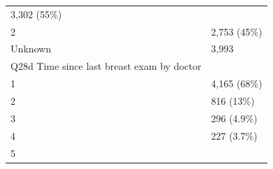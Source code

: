 \documentclass[]{article}
\begin{document}
\begin{longtable}[]{@{}ll@{}}
\begin{minipage}[t]{0.23\columnwidth}
3,302 (55\%)\strut
\end{minipage}\tabularnewline
\begin{minipage}[t]{0.71\columnwidth}\raggedright
2\strut
\end{minipage} & \begin{minipage}[t]{0.23\columnwidth}\raggedright
2,753 (45\%)\strut
\end{minipage}\tabularnewline
\begin{minipage}[t]{0.71\columnwidth}\raggedright
Unknown\strut
\end{minipage} & \begin{minipage}[t]{0.23\columnwidth}\raggedright
3,993\strut
\end{minipage}\tabularnewline
\begin{minipage}[t]{0.71\columnwidth}\raggedright
Q28d Time since last breast exam by doctor\strut
\end{minipage} & \begin{minipage}[t]{0.23\columnwidth}\raggedright
\strut
\end{minipage}\tabularnewline
\begin{minipage}[t]{0.71\columnwidth}\raggedright
1\strut
\end{minipage} & \begin{minipage}[t]{0.23\columnwidth}\raggedright
4,165 (68\%)\strut
\end{minipage}\tabularnewline
\begin{minipage}[t]{0.71\columnwidth}\raggedright
2\strut
\end{minipage} & \begin{minipage}[t]{0.23\columnwidth}\raggedright
816 (13\%)\strut
\end{minipage}\tabularnewline
\begin{minipage}[t]{0.71\columnwidth}\raggedright
3\strut
\end{minipage} & \begin{minipage}[t]{0.23\columnwidth}\raggedright
296 (4.9\%)\strut
\end{minipage}\tabularnewline
\begin{minipage}[t]{0.71\columnwidth}\raggedright
4\strut
\end{minipage} & \begin{minipage}[t]{0.23\columnwidth}\raggedright
227 (3.7\%)\strut
\end{minipage}\tabularnewline
\begin{minipage}[t]{0.71\columnwidth}\raggedright
5\strut
\end{minipage} & \begin{minipage}[t]{0.23\columnwidth}\raggedright

\end{minipage}
\end{longtable}
\end{document}
